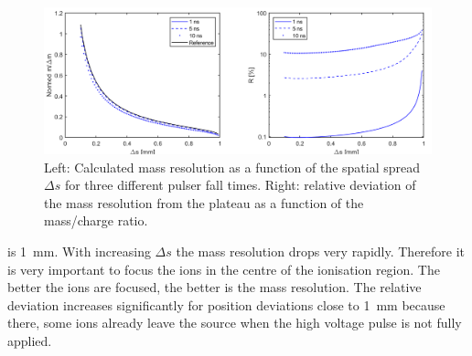 	\begin{figure}[H] %
		\centering
		\includegraphics[width=\textwidth]{Bilder/PulseSimPosition.png}
		\caption{Left: Calculated mass resolution as a function of the spatial spread $\Delta s$ for three different pulser fall times. Right: relative deviation of the mass resolution from the plateau as a function of the mass/charge ratio.}
		\label{fig:SimtfallPos}
	\end{figure}
	is 1~mm. With increasing $\Delta s$ the mass resolution drops very rapidly. Therefore it is very important to focus the ions in the centre of the ionisation region. The better the ions are focused, the better is the mass resolution. The relative deviation increases significantly for position deviations close to 1~mm because there, some ions already leave the source when the high voltage pulse is not fully applied.\\

